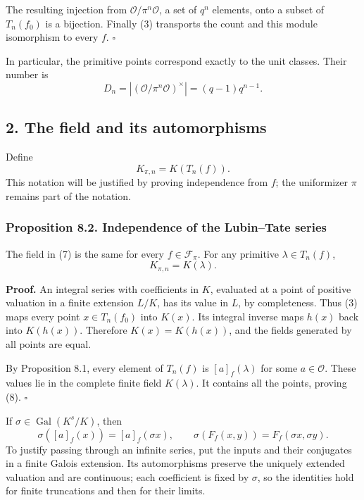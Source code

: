 \documentclass[11pt,a4paper]{article}
\begin{document}
The resulting injection from \(\mathcal O/\pi^n\mathcal O\), a set of
\(q^n\) elements, onto a subset of \(T_n(f_0)\) is a bijection. Finally
(3) transports the count and this module isomorphism to every \(f\).
\(\square\)

In particular, the primitive points correspond exactly to the unit
classes. Their number is \[
D_n=|(\mathcal O/\pi^n\mathcal O)^\times|
      =(q-1)q^{n-1}.
\tag{6}
\]

\subsection{2. The field and its
automorphisms}\label{the-field-and-its-automorphisms}

Define \[
K_{\pi,n}=K(T_n(f)).
\tag{7}
\] This notation will be justified by proving independence from \(f\);
the uniformizer \(\pi\) remains part of the notation.

\subsubsection{Proposition 8.2. Independence of the Lubin--Tate
series}\label{proposition-8.2.-independence-of-the-lubintate-series}

The field in (7) is the same for every \(f\in\mathcal F_\pi\). For any
primitive \(\lambda\in T_n(f)\), \[
K_{\pi,n}=K(\lambda).
\tag{8}
\]

\textbf{Proof.} An integral series with coefficients in \(K\), evaluated
at a point of positive valuation in a finite extension \(L/K\), has its
value in \(L\), by completeness. Thus (3) maps every point
\(x\in T_n(f_0)\) into \(K(x)\). Its integral inverse maps \(h(x)\) back
into \(K(h(x))\). Therefore \(K(x)=K(h(x))\), and the fields generated
by all points are equal.

By Proposition 8.1, every element of \(T_n(f)\) is \([a]_f(\lambda)\)
for some \(a\in\mathcal O\). These values lie in the complete finite
field \(K(\lambda)\). It contains all the points, proving (8).
\(\square\)

If \(\sigma\in\operatorname{Gal}(K^s/K)\), then \[
\sigma([a]_f(x))=[a]_f(\sigma x),\qquad
\sigma(F_f(x,y))=F_f(\sigma x,\sigma y).
\tag{9}
\] To justify passing through an infinite series, put the inputs and
their conjugates in a finite Galois extension. Its automorphisms
preserve the uniquely extended valuation and are continuous; each
coefficient is fixed by \(\sigma\), so the identities hold for finite
truncations and then for their limits.
\end{document}
